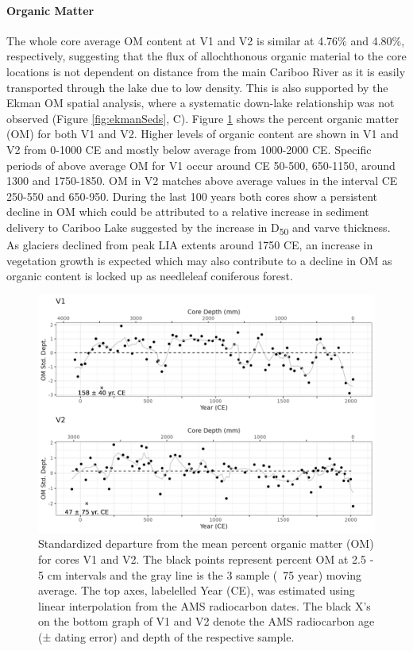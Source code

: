 \documentclass[Royal,times,doublespace,sageh]{sagej}
\begin{document}
\hypertarget{organic-matter}{%
\paragraph{Organic Matter}\label{organic-matter}}

The whole core average OM content at V1 and V2 is similar at 4.76\% and
4.80\%, respectively, suggesting that the flux of allochthonous organic
material to the core locations is not dependent on distance from the
main Cariboo River as it is easily transported through the lake due to
low density. This is also supported by the Ekman OM spatial analysis,
where a systematic down-lake relationship was not observed (Figure
\ref{fig:ekmanSeds}, C). Figure \ref{fig:loi} shows the percent organic
matter (OM) for both V1 and V2. Higher levels of organic content are
shown in V1 and V2 from 0-1000 CE and mostly below average from
1000-2000 CE. Specific periods of above average OM for V1 occur around
CE 50-500, 650-1150, around 1300 and 1750-1850. OM in V2 matches above
average values in the interval CE 250-550 and 650-950. During the last
100 years both cores show a persistent decline in OM which could be
attributed to a relative increase in sediment delivery to Cariboo Lake
suggested by the increase in D\textsubscript{50} and varve thickness. As
glaciers declined from peak LIA extents around 1750 CE, an increase in
vegetation growth is expected which may also contribute to a decline in
OM as organic content is locked up as needleleaf coniferous forest.

\begin{figure}

{\centering \includegraphics[width=1\linewidth]{figs/V1_V2_LOI_vs_depth_and_C14_est_yr} 

}

\caption{Standardized departure from the mean percent organic matter (OM) for cores V1 and V2. The black points represent percent OM at 2.5 - 5 cm intervals and the gray line is the 3 sample (~75 year) moving average. The top axes, labelelled Year (CE), was estimated using linear interpolation from the AMS radiocarbon dates. The black X's on the bottom graph of V1 and V2 denote the AMS radiocarbon age (± dating error) and depth of the respective sample.\label{loi}}\label{fig:loi}
\end{figure}
\end{document}
